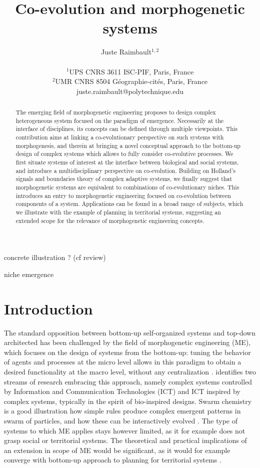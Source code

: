 \documentclass[letterpaper]{article}
\title{\vspace{-1cm}Co-evolution and morphogenetic systems}
\author{Juste Raimbault$^{1,2}$\\
\mbox{}\\
$^1$UPS CNRS 3611 ISC-PIF, Paris, France \\
$^2$UMR CNRS 8504 G{\'e}ographie-cit{\'e}s, Paris, France \\
juste.raimbault@polytechnique.edu} %
\begin{document}
\maketitle


\begin{abstract}
The emerging field of morphogenetic engineering proposes to design complex heterogeneous system focused on the paradigm of emergence. Necessarily at the interface of disciplines, its concepts can be defined through multiple viewpoints. This contribution aims at linking a co-evolutionary perspective on such systems with morphogenesis, and therein at bringing a novel conceptual approach to the bottom-up design of complex systems which allows to fully consider co-evolutive processes. We first situate systems of interest at the interface between biological and social systems, and introduce a multidisciplinary perspective on co-evolution. Building on Holland's signals and boundaries theory of complex adaptive systems, we finally suggest that morphogenetic systems are equivalent to combinations of co-evolutionary niches. This introduces an entry to morphogenetic engineering focused on co-evolution between components of a system. Applications can be found in a broad range of subjects, which we illustrate with the example of planning in territorial systems, suggesting an extended scope for the relevance of morphogenetic engineering concepts.
\end{abstract}



\cite{von2012swarm} concrete illustration ? (cf review)


\cite{gatti2018niche} niche emergence

\section{Introduction}


The standard opposition between bottom-up self-organized systems and top-down architected has been challenged by the field of morphogenetic engineering (ME), which focuses on the design of systems from the bottom-up: tuning the behavior of agents and processes at the micro level allows in this paradigm to obtain a desired functionality at the macro level, without any centralization \citep{doursat2013review}. \cite{doursat2011myriads} identifies two streams of research embracing this approach, namely complex systems controlled by Information and Communication Technologies (ICT) and ICT inspired by complex systems, typically in the spirit of bio-inspired designs. Swarm chemistry \citep{sayama2009swarm} is a good illustration how simple rules produce complex emergent patterns in swarm of particles, and how these can be interactively evolved \citep{sayama2009enhancing}. The type of systems to which ME applies stays however limited, as it for example does not grasp social or territorial systems. The theoretical and practical implications of an extension in scope of ME would be significant, as it would for example converge with bottom-up approach to planning for territorial systems \citep{batty2007cities}. 
\end{document}
